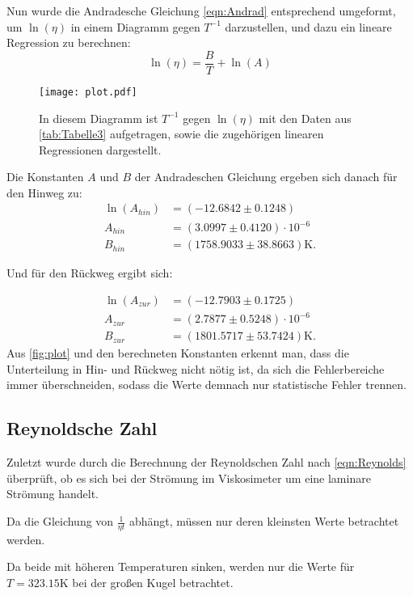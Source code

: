 Nun wurde die Andradesche Gleichung \eqref{eqn:Andrad} entsprechend umgeformt,
 um $\ln\left(\eta\right)$ in einem Diagramm gegen $T^{-1}$ darzustellen, und dazu ein lineare Regression zu berechnen:
\begin{equation*}
  \ln\left(\eta\right) = \frac{B}{T} + \ln\left(A\right)
\end{equation*}
\begin{figure}[H]
  \centering
  \texttt{[image: plot.pdf]}
  \caption{In diesem Diagramm ist $T^{-1}$ gegen $\ln\left(\eta\right)$ mit den Daten aus \autoref{tab:Tabelle3} aufgetragen, 
  sowie die zugehörigen linearen Regressionen dargestellt.}
  \label{fig:plot}
\end{figure}

Die Konstanten $A$ und $B$ der Andradeschen Gleichung ergeben sich danach für den Hinweg zu:
\begin{align*}
  \ln\left(A_{hin}\right) &= (-12.6842\pm 0.1248) \\
  A_{hin} &= (3.0997\pm 0.4120 ) \cdot 10^{-6} \\
  B_{hin} &= (1758.9033\pm 38.8663)\unit{\kelvin}.
\end{align*}

Und für den Rückweg ergibt sich:

\begin{align*}
  \ln\left(A_{zur}\right) &= (-12.7903\pm 0.1725) \\
  A_{zur} &= (2.7877\pm 0.5248 ) \cdot 10^{-6} \\
  B_{zur} &= (1801.5717\pm 53.7424)\unit{\kelvin}.
\end{align*}
Aus \autoref{fig:plot} und den berechneten Konstanten erkennt man, dass die Unterteilung in Hin- und Rückweg nicht nötig ist, da sich die Fehlerbereiche
immer überschneiden, sodass die Werte demnach nur statistische Fehler trennen.

\subsection{Reynoldsche Zahl}

Zuletzt wurde durch die Berechnung der Reynoldschen Zahl nach \eqref{eqn:Reynolds} überprüft, ob es sich bei der
Strömung im Viskosimeter um eine laminare Strömung handelt. 

Da die Gleichung von $\frac{1}{\eta t}$ abhängt,
müssen nur deren kleinsten Werte betrachtet werden.

Da beide mit höheren Temperaturen sinken, werden nur die Werte für
$T = 323.15\unit{\kelvin}$ bei der großen Kugel betrachtet. 

